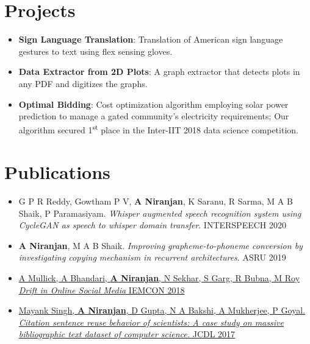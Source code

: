 \documentclass[letterpaper,11pt]{article}
\newcommand{\resumeItem}[2]{
  \item\small{
    \textbf{#1}{: #2 \vspace{-3pt}}
  }
}
\newcommand{\resumeItemx}[2]{
  \item\small{
    \textbf{#1}{#2 \vspace{-3pt}}
  }
}
\newcommand{\resumeSubItem}[2]{\resumeItem{#1}{#2}\vspace{-5pt}}
\newcommand{\resumeSubItemx}[2]{\resumeItemx{#1}{#2}\vspace{-5pt}}
\newcommand{\resumeSubHeadingListStart}{\begin{itemize}[leftmargin=*]}
\newcommand{\resumeSubHeadingListEnd}{\end{itemize}\vspace{-16pt}}
\begin{document}
\vspace{1mm}
\section{Projects}
  \resumeSubHeadingListStart
    \resumeSubItem{Sign Language Translation}
      {Translation of American sign language gestures to text using flex sensing gloves.}
    \resumeSubItem{Data Extractor from 2D Plots}
      {A graph extractor that detects plots in any PDF and digitizes the graphs.}
    \resumeSubItem{Optimal Bidding}
      {Cost optimization algorithm employing solar power prediction to manage a gated community's electricity requirements; Our algorithm secured 1\textsuperscript{st} place in the Inter-IIT 2018 data science competition.}
  \resumeSubHeadingListEnd


\vspace{1mm}
\section{Publications}
  \resumeSubHeadingListStart
    \resumeSubItemx{}{G P R Reddy, Gowtham P V, \textbf{A Niranjan}, K Saranu, R Sarma, M A B Shaik, P Paramasiyam. \textit{Whisper augmented speech recognition system using CycleGAN as speech to whisper domain transfer}. INTERSPEECH 2020}
    \resumeSubItemx{}{\textbf{A Niranjan}, M A B Shaik. \textit{Improving grapheme-to-phoneme conversion by investigating copying mechanism in recurrent architectures}. ASRU 2019}
    \resumeSubItemx{}{\href{https://ieeexplore.ieee.org/document/8614746}{A Mullick, A Bhandari, \textbf{A Niranjan}, N Sekhar, S Garg,  R Bubna, M Roy \textit{Drift in Online Social Media} IEMCON 2018}}
    \resumeSubItemx{}{\href{https://ieeexplore.ieee.org/document/7991589}{Mayank Singh, \textbf{A Niranjan}, D Gupta, N A Bakshi, A Mukherjee, P Goyal. \textit{Citation sentence reuse behavior of scientists: A case study on massive bibliographic text dataset of computer science.} JCDL 2017}}
  \resumeSubHeadingListEnd








\end{document}
